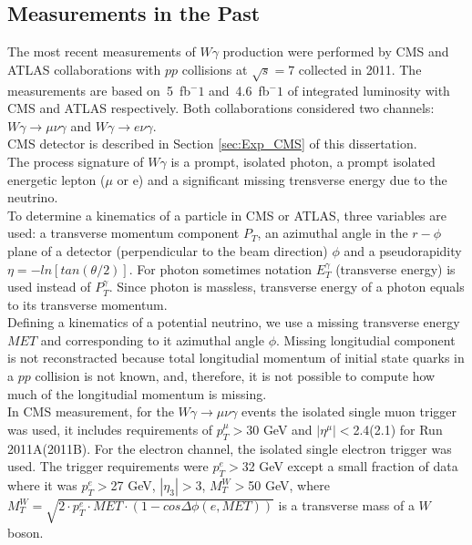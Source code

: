 \subsection{Measurements in the Past}

The most recent measurements of $W\gamma$ production were performed by CMS \cite{ref_7TeV_CMS} and ATLAS \cite{ref_7TeV_ATLAS} collaborations with $pp$ collisions at $\sqrt{s}=7$ collected in 2011. The measurements are based on~5~fb$^-1$ and~4.6~fb$^-1$ of integrated luminosity with CMS and ATLAS respectively. Both collaborations considered two channels: $W\gamma\rightarrow\mu\nu\gamma$ and $W\gamma\rightarrow e\nu\gamma$.\\

CMS detector is described in Section \ref{sec:Exp_CMS} of this dissertation.\\

The process signature of $W\gamma$ is a prompt, isolated photon, a prompt isolated energetic lepton ($\mu$ or e) and a significant missing trensverse energy due to the neutrino. \\ 

To determine a kinematics of a particle in CMS or ATLAS, three variables are used: a transverse momentum component $P_T$, an azimuthal angle in the $r-\phi$ plane of a detector (perpendicular to the beam direction) $\phi$ and a pseudorapidity $\eta=-ln[tan(\theta/2)]$. For photon sometimes notation $E_T^\gamma$ (transverse energy) is used instead of $P_T^\gamma$. Since photon is massless, transverse energy of a photon equals to its transverse momentum.\\

Defining a kinematics of a potential neutrino, we use a missing transverse energy $MET$ and corresponding to it azimuthal angle $\phi$. Missing longitudial component is not reconstracted because total longitudial momentum of initial state quarks in a $pp$ collision is not known, and, therefore, it is not possible to compute how much of the longitudial momentum is missing.\\  

In CMS measurement, for the $W\gamma\rightarrow\mu\nu\gamma$ events the isolated single muon trigger was used, it includes requirements of $p_T^{\mu}>$30 GeV and $|\eta^{\mu}|<$2.4(2.1) for Run 2011A(2011B). For the electron channel, the isolated single electron trigger was used. The trigger requirements were $p_T^e>$32 GeV except a small fraction of data where it was $p_T^e>$27 GeV, $|\eta_3|>$3, $M_T^W>$50 GeV, where $M_T^W=\sqrt{2 \cdot p_T^e \cdot MET \cdot (1-cos\Delta\phi(e,MET))}$ is a transverse mass of a $W$ boson.\\

